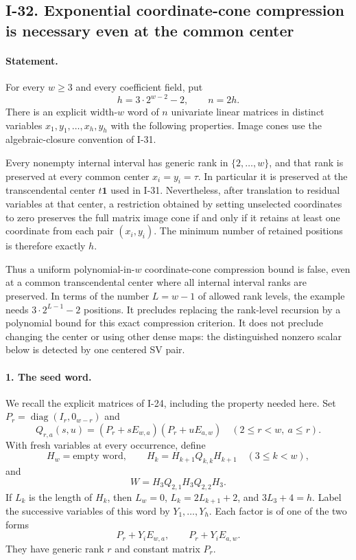 \documentclass[11pt,a4paper]{article}
\theoremstyle{definition}\newtheorem{definition}{Definition}
\begin{document}
\subsection{I-32. Exponential coordinate-cone compression is necessary even at the common center}
\label{I-32}

\paragraph{Statement.}
For every $w\geq3$ and every coefficient field, put
\[
 h=3\cdot2^{w-2}-2,\qquad n=2h.
\]
There is an explicit width-$w$ word of $n$ univariate linear
matrices in distinct variables $x_1,y_1,\ldots,x_h,y_h$ with
the following properties. Image cones use the algebraic-closure
convention of I-31.

Every nonempty internal interval has generic rank in
$\{2,\ldots,w\}$, and that rank is preserved at every common
center $x_i=y_i=\tau$. In particular it is preserved at the
transcendental center $t\mathbf1$ used in I-31. Nevertheless,
after translation to residual variables at that center, a
restriction obtained by setting unselected coordinates to zero
preserves the full matrix image cone if and only if it retains
at least one coordinate from each pair $(x_i,y_i)$. The minimum
number of retained positions is therefore exactly $h$.

Thus a uniform polynomial-in-$w$ coordinate-cone compression
bound is false, even at a common transcendental center where
all internal interval ranks are preserved. In terms of the
number $L=w-1$ of allowed rank levels, the example needs
$3\cdot2^{L-1}-2$ positions. It precludes replacing the rank-level
recursion by a polynomial bound for this exact compression
criterion. It does not preclude changing the center or using
other dense maps: the distinguished nonzero scalar below is
detected by one centered SV pair.

\paragraph{1. The seed word.}
We recall the explicit matrices of I-24, including the property
needed here. Set $P_r=\operatorname{diag}(I_r,0_{w-r})$ and
\[
 Q_{r,a}(s,u)=(P_r+sE_{w,a})(P_r+uE_{a,w})
       \quad(2\leq r<w,\ a\leq r).
\]
With fresh variables at every occurrence, define
\[
 H_w=\text{empty word},\qquad
 H_k=H_{k+1}Q_{k,k}H_{k+1}\quad(3\leq k<w),
\]
and
\[
 W=H_3Q_{2,1}H_3Q_{2,2}H_3.
\]
If $L_k$ is the length of $H_k$, then
$L_w=0$, $L_k=2L_{k+1}+2$, and
$3L_3+4=h$. Label the successive variables of this word by
$Y_1,\ldots,Y_h$. Each factor is of one of the two forms
\[
 P_r+Y_iE_{w,a},\qquad P_r+Y_iE_{a,w}.
 \tag{I.54}
\]
They have generic rank $r$ and constant matrix $P_r$.
\end{document}
